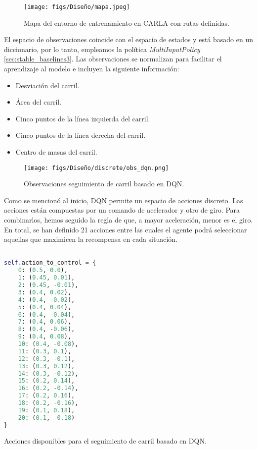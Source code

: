 \begin{figure}[ht]
  \centering
  \texttt{[image: figs/Diseño/mapa.jpeg]}
  \caption{Mapa del entorno de entrenamiento en CARLA con rutas definidas.}
  \label{fig:mapa}
\end{figure}

\newpage

El espacio de observaciones coincide con el espacio de estados y está basado en un diccionario, por lo tanto, empleamos la política \textit{MultiInputPolicy} \ref{sec:stable_baselines3}. Las observaciones se normalizan para facilitar el aprendizaje al modelo e incluyen la siguiente información: 
\begin{itemize}
		\item Desviación del carril.
		\item Área del carril.
		\item Cinco puntos de la línea izquierda del carril.
		\item Cinco puntos de la línea derecha del carril.
		\item Centro de masas del carril.
\end{itemize}

\begin{figure}[ht]
  \centering
  \texttt{[image: figs/Diseño/discrete/obs\_dqn.png]}
  \caption{Observaciones seguimiento de carril basado en \ac{DQN}.}
  \label{fig:dqn_obs}
\end{figure}

Como se mencionó al inicio, \ac{DQN} permite un espacio de acciones discreto. Las acciones están compuestas por un comando de acelerador y otro de giro. Para combinarlos, hemos seguido la regla de que, a mayor aceleración, menor es el giro. En total, se han definido 21 acciones entre las cuales el agente podrá seleccionar aquellas que maximicen la recompensa en cada situación.
\begin{code}[h]
\begin{lstlisting}[language=Python]

self.action_to_control = {
    0: (0.5, 0.0),
    1: (0.45, 0.01), 
    2: (0.45, -0.01),
    3: (0.4, 0.02),
    4: (0.4, -0.02),
    5: (0.4, 0.04),
    6: (0.4, -0.04),
    7: (0.4, 0.06),
    8: (0.4, -0.06),
    9: (0.4, 0.08),
    10: (0.4, -0.08),
    11: (0.3, 0.1),
    12: (0.3, -0.1),
    13: (0.3, 0.12),
    14: (0.3, -0.12),
    15: (0.2, 0.14),
    16: (0.2, -0.14),
    17: (0.2, 0.16),
    18: (0.2, -0.16),
    19: (0.1, 0.18),
    20: (0.1, -0.18)
}
\end{lstlisting}
\caption[Acciones disponibles para el seguimiento de carril basado en \ac{DQN}]{Acciones disponibles para el seguimiento de carril basado en \ac{DQN}.}
\label{cod:acc_dqn}
\end{code}

